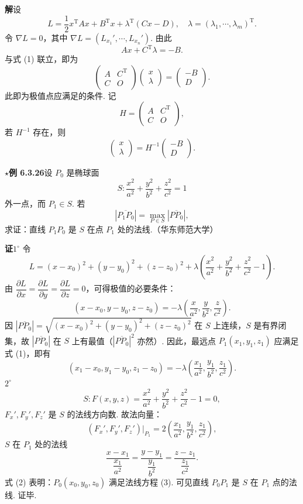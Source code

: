 \documentclass[UTF8, 12pt, fontset=fandol, oneside]{ctexart}
\begin{document}
\noindent\textbf{解}\quad 设
\[
  L=\frac12x^{\mathrm T}Ax+B^{\mathrm T}x+\lambda^{\mathrm T}(Cx-D),
  \quad \lambda=(\lambda_1,\cdots,\lambda_m)^{\mathrm T}.
\]
令 $\nabla L=0$，其中 $\nabla L=(L_{x_1}',\cdots,L_{x_n}')$. 由此
\[
  Ax+C^{\mathrm T}\lambda=-B.
\]
与式 (1) 联立，即为
\[
  \begin{pmatrix}
    A&C^{\mathrm T}\\
    C&O
  \end{pmatrix}
  \begin{pmatrix}
    x\\ \lambda
  \end{pmatrix}
  =
  \begin{pmatrix}
    -B\\D
  \end{pmatrix}.
\]
此即为极值点应满足的条件. 记
\[
  H=\begin{pmatrix}
    A&C^{\mathrm T}\\
    C&O
  \end{pmatrix},
\]
若 $H^{-1}$ 存在，则
\[
  \begin{pmatrix}
    x\\ \lambda
  \end{pmatrix}
  =
  H^{-1}
  \begin{pmatrix}
    -B\\D
  \end{pmatrix}.
\]

\noindent\textbf{\ensuremath{\star}例 6.3.26}\quad 设 $P_0$ 是椭球面
\[
  S:\frac{x^2}{a^2}+\frac{y^2}{b^2}+\frac{z^2}{c^2}=1
\]
外一点，而 $P_1\in S$. 若
\[
  |\overline{P_1P_0}|=\max_{P\in S}|\overline{PP_0}|,
\]
求证：直线 $P_1P_0$ 是 $S$ 在点 $P_1$ 处的法线.（华东师范大学）

\noindent\textbf{证}\quad $1^\circ$ 令
\[
  L=(x-x_0)^2+(y-y_0)^2+(z-z_0)^2
  +\lambda\left(\frac{x^2}{a^2}+\frac{y^2}{b^2}+\frac{z^2}{c^2}-1\right).
\]
由 $\dfrac{\partial L}{\partial x}=\dfrac{\partial L}{\partial y}=\dfrac{\partial L}{\partial z}=0$，可得极值的必要条件：
\[
  (x-x_0,y-y_0,z-z_0)=-\lambda\left(\frac{x}{a^2},\frac{y}{b^2},\frac{z}{c^2}\right). \tag{1}
\]
因 $|\overline{PP_0}|=\sqrt{(x-x_0)^2+(y-y_0)^2+(z-z_0)^2}$ 在 $S$ 上连续，$S$ 是有界闭集，故 $|\overline{PP_0}|$ 在 $S$ 上有最值（$|\overline{PP_0}|^2$ 亦然）. 因此，最远点 $P_1(x_1,y_1,z_1)$ 应满足式 (1)，即有
\[
  (x_1-x_0,y_1-y_0,z_1-z_0)
  =-\lambda\left(\frac{x_1}{a^2},\frac{y_1}{b^2},\frac{z_1}{c^2}\right). \tag{2}
\]
$2^\circ$
\[
  S:F(x,y,z)=\frac{x^2}{a^2}+\frac{y^2}{b^2}+\frac{z^2}{c^2}-1=0,
\]
$F_x',F_y',F_z'$ 是 $S$ 的法线方向数. 故法向量：
\[
  (F_x',F_y',F_z')\big|_{P_1}
  =2\left(\frac{x_1}{a^2},\frac{y_1}{b^2},\frac{z_1}{c^2}\right),
\]
$S$ 在 $P_1$ 处的法线
\[
  \frac{x-x_1}{\dfrac{x_1}{a^2}}
  =\frac{y-y_1}{\dfrac{y_1}{b^2}}
  =\frac{z-z_1}{\dfrac{z_1}{c^2}}. \tag{3}
\]
式 (2) 表明：$P_0(x_0,y_0,z_0)$ 满足法线方程 (3). 可见直线 $P_0P_1$ 是 $S$ 在 $P_1$ 点的法线. 证毕.
\end{document}
